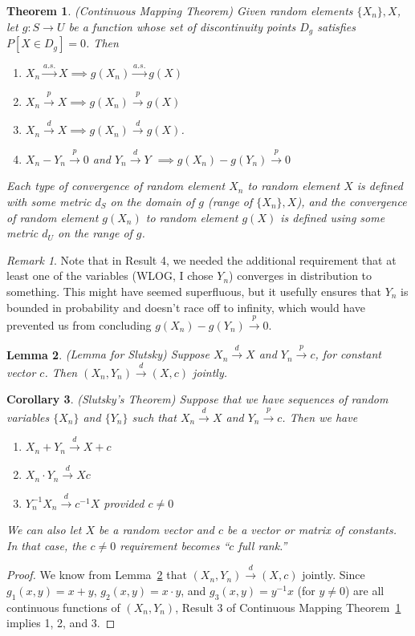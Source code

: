 \documentclass[12pt]{article}
\theoremstyle{plain}
\newtheorem{thm}{Theorem}[section]
\newtheorem{lem}[thm]{Lemma}
\newtheorem{cor}[thm]{Corollary}
\theoremstyle{definition}
\theoremstyle{remark}
\newtheorem*{rmk}{Remark}
\newcommand{\ra}{\rightarrow}
\newcommand{\asto}{\xrightarrow{a.s.}}
\newcommand{\pto}{\xrightarrow{p}}
\newcommand{\dto}{\xrightarrow{d}}
\begin{document}
\begin{thm}\emph{(Continuous Mapping Theorem)}
\label{thm:cmt}
Given random elements $\{X_n\},X$, let $g:S\ra U$ be a function whose
set of discontinuity points $D_g$ satisfies $P[X\in D_g]=0$.
Then
\begin{enumerate}
  \item $X_n\asto X \implies g(X_n) \asto g(X)$
  \item $X_n\pto X \implies g(X_n) \pto g(X)$
  \item $X_n\dto X \implies g(X_n) \dto g(X)$.
  \item $X_n - Y_n\pto 0$ and $Y_n \dto Y$
    $\implies g(X_n) - g(Y_n)\pto 0$

\end{enumerate}
Each type of convergence of random element $X_n$ to random element
$X$ is defined with some metric $d_S$ on the domain of $g$ (range of
$\{X_n\},X$), and the convergence of random element $g(X_n)$
to random element $g(X)$ is defined using some metric $d_U$ on the range
of $g$.
\end{thm}
\begin{rmk}
Note that in Result 4, we needed the additional requirement that at
least one of the variables (WLOG, I chose $Y_n$) converges in
distribution to something.  This might have seemed superfluous, but it
usefully ensures that $Y_n$ is bounded in probability and doesn't race
off to infinity, which would have prevented us from concluding
$g(X_n)-g(Y_n) \pto 0$.
\end{rmk}


\begin{lem}
\label{lem:joint}
\emph{(Lemma for Slutsky)}
Suppose $X_n\dto X$ and $Y_n\pto c$, for constant vector $c$.
Then $(X_n,Y_n)\dto (X,c)$ jointly.
\end{lem}


\begin{cor}{\emph{(Slutsky's Theorem)}}
Suppose that we have sequences of random variables $\{X_n\}$ and
$\{Y_n\}$ such that $X_n \dto X$ and $Y_n \pto c$.
Then we have
\begin{enumerate}
  \item $X_n+Y_n\dto X+c$
  \item $X_n\cdot Y_n\dto Xc$
  \item $Y_n^{-1}X_n\dto c^{-1}X$ provided $c\neq 0$
\end{enumerate}
We can also let $X$ be a random vector and $c$ be a vector or matrix of
constants. In that case, the $c\neq 0$ requirement becomes ``$c$ full
rank.''
\end{cor}
\begin{proof}
We know from Lemma~\ref{lem:joint} that $(X_n,Y_n)\dto (X,c)$ jointly.
Since $g_1(x,y) = x+y$, $g_2(x,y)=x\cdot y$, and $g_3(x,y)=y^{-1}x$
(for $y\neq 0$) are all continuous functions of $(X_n,Y_n)$, Result 3 of
Continuous Mapping Theorem~\ref{thm:cmt} implies 1, 2, and 3.
\end{proof}
\end{document}
